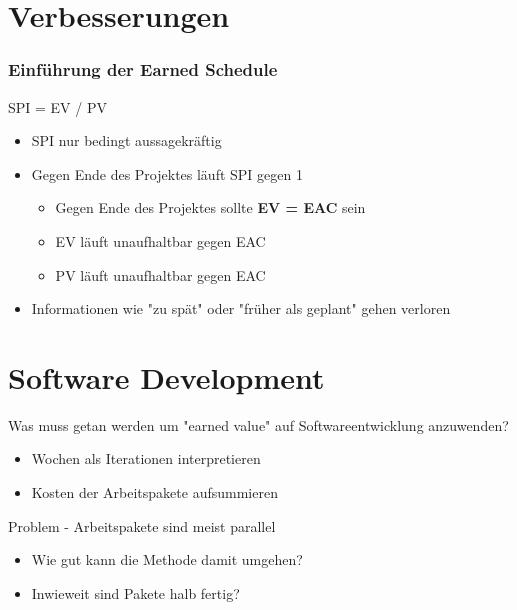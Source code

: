 \documentclass{f4_beamer}
\begin{document}
\section{Verbesserungen}
\begin{frame}[fragile]
    \frametitle{Einführung der Earned Schedule}
    \begin{center}
        \LARGE
        SPI = EV / PV
    \end{center}
    \Large
    \begin{itemize}
        \item SPI nur bedingt aussagekräftig
        \item Gegen Ende des Projektes läuft SPI gegen 1
        \begin{itemize}
            \item Gegen Ende des Projektes sollte \textbf{EV = EAC} sein
            \item EV läuft unaufhaltbar gegen EAC
            \item PV läuft unaufhaltbar gegen EAC
        \end{itemize}
        \item Informationen wie "zu spät" oder "früher als geplant" gehen verloren
    \end{itemize}
\end{frame}


\section{Software Development}
\begin{frame}[fragile]
    Was muss getan werden um "earned value" auf Softwareentwicklung anzuwenden?
    \begin{itemize}
        \item Wochen als Iterationen interpretieren
        \item Kosten der Arbeitspakete aufsummieren
    \end{itemize}
\end{frame}
\begin{frame}[fragile]
    Problem - Arbeitspakete sind meist parallel
    \begin{itemize}
        \item Wie gut kann die Methode damit umgehen?
        \item Inwieweit sind Pakete halb fertig?
    \end{itemize}
\end{frame}
\end{document}
